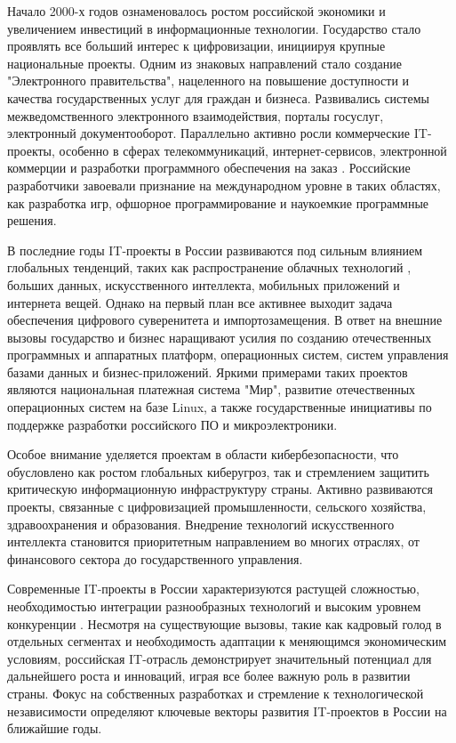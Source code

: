 Начало 2000-х годов ознаменовалось ростом российской экономики и увеличением инвестиций в информационные технологии. Государство стало проявлять все больший интерес к цифровизации, инициируя крупные национальные проекты. Одним из знаковых направлений стало создание "Электронного правительства", нацеленного на повышение доступности и качества государственных услуг для граждан и бизнеса. Развивались системы межведомственного электронного взаимодействия, порталы госуслуг, электронный документооборот. Параллельно активно росли коммерческие IT-проекты, особенно в сферах телекоммуникаций, интернет-сервисов, электронной коммерции и разработки программного обеспечения на заказ \cite{management5}. Российские разработчики завоевали признание на международном уровне в таких областях, как разработка игр, офшорное программирование и наукоемкие программные решения.

В последние годы IT-проекты в России развиваются под сильным влиянием глобальных тенденций, таких как распространение облачных технологий \cite{management10}, больших данных, искусственного интеллекта, мобильных приложений и интернета вещей. Однако на первый план все активнее выходит задача обеспечения цифрового суверенитета и импортозамещения. В ответ на внешние вызовы государство и бизнес наращивают усилия по созданию отечественных программных и аппаратных платформ, операционных систем, систем управления базами данных и бизнес-приложений. Яркими примерами таких проектов являются национальная платежная система "Мир", развитие отечественных операционных систем на базе Linux, а также государственные инициативы по поддержке разработки российского ПО и микроэлектроники.

Особое внимание уделяется проектам в области кибербезопасности, что обусловлено как ростом глобальных киберугроз, так и стремлением защитить критическую информационную инфраструктуру страны. Активно развиваются проекты, связанные с цифровизацией промышленности, сельского хозяйства, здравоохранения и образования. Внедрение технологий искусственного интеллекта становится приоритетным направлением во многих отраслях, от финансового сектора до государственного управления.

Современные IT-проекты в России характеризуются растущей сложностью, необходимостью интеграции разнообразных технологий и высоким уровнем конкуренции \cite{management2}. Несмотря на существующие вызовы, такие как кадровый голод в отдельных сегментах и необходимость адаптации к меняющимся экономическим условиям, российская IT-отрасль демонстрирует значительный потенциал для дальнейшего роста и инноваций, играя все более важную роль в развитии страны. Фокус на собственных разработках и стремление к технологической независимости определяют ключевые векторы развития IT-проектов в России на ближайшие годы.

